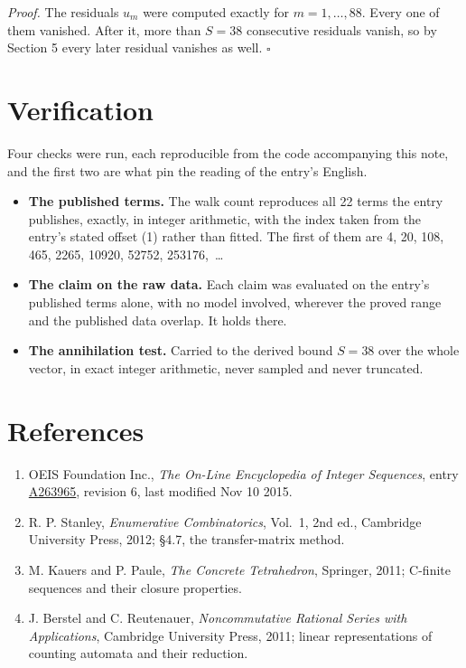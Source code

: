 \documentclass[11pt]{article}
\theoremstyle{definition}
\begin{document}
{\itshape Proof.} The residuals $u_m$ were computed exactly for $m = 1,\dots,88$. Every one of them vanished. After it, more than $S = 38$ consecutive residuals vanish, so by Section 5 every later residual vanishes as well. $\square$

\section{Verification}

Four checks were run, each reproducible from the code accompanying this note, and the first two are what pin the reading of the entry's English.

\begin{itemize}

\item {\bfseries The published terms.} The walk count reproduces all 22 terms the entry publishes, exactly, in integer arithmetic, with the index taken from the entry's stated offset (1) rather than fitted. The first of them are 4, 20, 108, 465, 2265, 10920, 52752, 253176,~\dots

\item {\bfseries The claim on the raw data.} Each claim was evaluated on the entry's published terms alone, with no model involved, wherever the proved range and the published data overlap. It holds there.

\item {\bfseries The annihilation test.} Carried to the derived bound $S = 38$ over the whole vector, in exact integer arithmetic, never sampled and never truncated.

\end{itemize}

\section{References}

\begin{enumerate}

\item OEIS Foundation Inc., \emph{The On-Line Encyclopedia of Integer Sequences}, entry \href{https://oeis.org/A263965}{A263965}, revision 6, last modified Nov 10 2015.

\item R. P. Stanley, \emph{Enumerative Combinatorics}, Vol.~1, 2nd ed., Cambridge University Press, 2012; \S4.7, the transfer-matrix method.

\item M. Kauers and P. Paule, \emph{The Concrete Tetrahedron}, Springer, 2011; C-finite sequences and their closure properties.

\item J. Berstel and C. Reutenauer, \emph{Noncommutative Rational Series with Applications}, Cambridge University Press, 2011; linear representations of counting automata and their reduction.

\end{enumerate}
\end{document}
